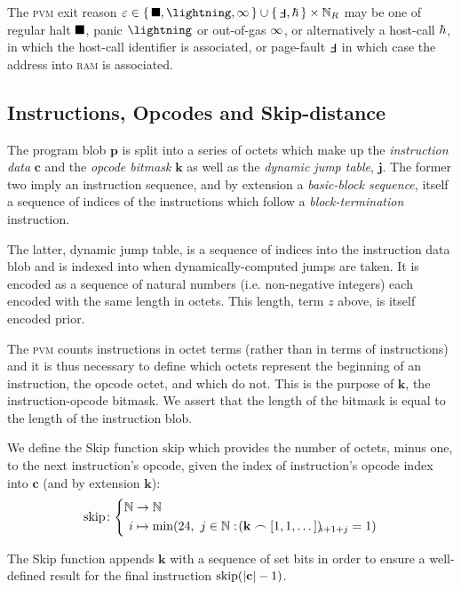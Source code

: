 The \textsc{pvm} exit reason $\varepsilon \in \set{\halt, \panic, \oog} \cup \set{\fault, \host} \times \pvmreg$ may be one of regular halt $\blacksquare$, panic $\panic$ or out-of-gas $\infty$, or alternatively a host-call $\hbar$, in which the host-call identifier is associated, or page-fault $\fault$ in which case the address into \textsc{ram} is associated.

\subsection{Instructions, Opcodes and Skip-distance}

The program blob $\mathbf{p}$ is split into a series of octets which make up the \emph{instruction data} $\mathbf{c}$ and the \emph{opcode bitmask} $\mathbf{k}$ as well as the \emph{dynamic jump table}, $\mathbf{j}$. The former two imply an instruction sequence, and by extension a \emph{basic-block sequence}, itself a sequence of indices of the instructions which follow a \emph{block-termination} instruction.

The latter, dynamic jump table, is a sequence of indices into the instruction data blob and is indexed into when dynamically-computed jumps are taken. It is encoded as a sequence of natural numbers (i.e. non-negative integers) each encoded with the same length in octets. This length, term $z$ above, is itself encoded prior.

The \textsc{pvm} counts instructions in octet terms (rather than in terms of instructions) and it is thus necessary to define which octets represent the beginning of an instruction, \ie the opcode octet, and which do not. This is the purpose of $\mathbf{k}$, the instruction-opcode bitmask. We assert that the length of the bitmask is equal to the length of the instruction blob.

\newcommand{\Fskip}{\text{skip}}

We define the Skip function $\Fskip$ which provides the number of octets, minus one, to the next instruction's opcode, given the index of instruction's opcode index into $\mathbf{c}$ (and by extension $\mathbf{k}$):
\begin{equation}
  \Fskip\colon\abracegroup{
    \N &\to \N\\
    i &\mapsto \min(24,\ j \in \N : \tup{\mathbf{k} \concat [1, 1, \dots]}_{i + 1 + j} = 1)
  }
\end{equation}

The Skip function appends $\mathbf{k}$ with a sequence of set bits in order to ensure a well-defined result for the final instruction $\Fskip(\len{\mathbf{c}} - 1)$.

